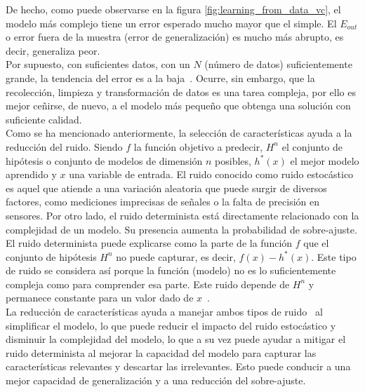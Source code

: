 De hecho, como puede observarse en la figura \ref{fig:learning_from_data_vc}, el modelo más complejo tiene un error esperado mucho mayor que el simple. El $E_{out}$ o error fuera de la muestra (error de generalización) es mucho más abrupto, es decir, generaliza peor.\\[6pt]
Por supuesto, con suficientes datos, con un $N$ (número de datos) suficientemente grande, la tendencia del error es a la baja~\cite{Mostafa2012, shalev2014understanding}. Ocurre, sin embargo, que la recolección, limpieza y transformación de datos es una tarea compleja, por ello es mejor ceñirse, de nuevo, a el modelo más pequeño que obtenga una solución con suficiente calidad.\\[6pt]

Como se ha mencionado anteriormente, la selección de características ayuda a la reducción del ruido. Siendo $f$ la función objetivo a predecir, $H^n$ el conjunto de hipótesis o conjunto de modelos de dimensión $n$ posibles, $h^*(x)$ el mejor modelo aprendido y $x$ una variable de entrada. El ruido conocido
como ruido estocástico es aquel que atiende a una variación aleatoria que
puede surgir de diversos factores, como mediciones imprecisas de señales o la falta de
precisión en sensores. Por otro lado, el ruido determinista está directamente
relacionado con la complejidad de un modelo. Su presencia aumenta la probabilidad de
sobre-ajuste. El ruido determinista puede explicarse como la parte de la función $f$ que el conjunto
de hipótesis $H^n$ no puede capturar, es decir, $f(x) - h^*(x)$. Este tipo de ruido se
considera así porque la función (modelo) no es lo suficientemente compleja como para comprender
esa parte. Este ruido depende de $H^n$ y permanece constante para un valor dado de $x$~\cite{Mostafa2012}.\\[6pt]
La reducción de características ayuda a manejar ambos tipos de ruido~\cite{miao_survey_2016,Mostafa2012} al simplificar el
modelo, lo que puede reducir el impacto del ruido estocástico y disminuir la complejidad del
modelo, lo que a su vez puede ayudar a mitigar el ruido determinista al mejorar la capacidad
del modelo para capturar las características relevantes y descartar las irrelevantes.
Esto puede conducir a una mejor capacidad de generalización y a una reducción del sobre-ajuste.\\[6pt]

